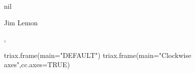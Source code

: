 \begin{Value}
nil
\end{Value}
\begin{Author}\relax
Jim Lemon
\end{Author}
\begin{SeeAlso}\relax
{},
\end{SeeAlso}
\begin{Examples}
\begin{ExampleCode}
 triax.frame(main="DEFAULT")
 triax.frame(main="Clockwise axes",cc.axes=TRUE)
\end{ExampleCode}
\end{Examples}

